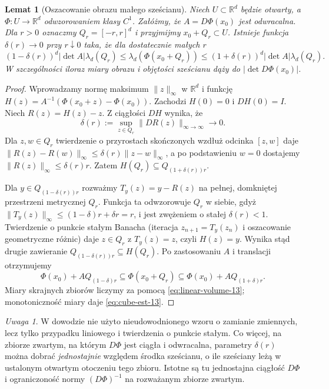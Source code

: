 \documentclass[11pt,a4paper,oneside]{book}
\numberwithin{equation}{chapter}
\theoremstyle{plain}
\newtheorem{lemat}[twierdzenie]{Lemat}
\theoremstyle{definition}
\theoremstyle{remark}
\newtheorem{uwaga}[twierdzenie]{Uwaga}
\begin{document}
\begin{lemat}[Oszacowanie obrazu małego sześcianu]
\label{lem:small-cube-13}
Niech $U\subset\mathbb R^d$ będzie otwarty, a
$\Phi:U\to\mathbb R^d$ odwzorowaniem klasy $C^1$.
Załóżmy, że $A=D\Phi(x_0)$ jest odwracalna.
Dla $r>0$ oznaczmy $Q_r=[-r,r]^d$ i przyjmijmy
$x_0+Q_r\subset U$. Istnieje funkcja $\delta(r)\to0$
przy $r\downarrow0$ taka, że dla dostatecznie małych $r$
\begin{equation}\label{eq:cube-est-13}
(1-\delta(r))^d|\det A|\lambda_d(Q_r)
\le \lambda_d(\Phi(x_0+Q_r))
\le(1+\delta(r))^d|\det A|\lambda_d(Q_r).
\end{equation}
W szczególności iloraz miary obrazu i objętości sześcianu
dąży do $|\det D\Phi(x_0)|$.
\end{lemat}
\begin{proof}
Wprowadzamy normę maksimum $\|z\|_\infty$ w $\mathbb R^d$
i funkcję $H(z)=A^{-1}(\Phi(x_0+z)-\Phi(x_0))$.
Zachodzi $H(0)=0$ i $DH(0)=I$.
Niech $R(z)=H(z)-z$. Z ciągłości $DH$ wynika, że
\[
\delta(r):=\sup_{z\in Q_r}\|DR(z)\|_{\infty\to\infty}
\longrightarrow0.
\]
Dla $z,w\in Q_r$ twierdzenie o przyrostach skończonych
wzdłuż odcinka $[z,w]$ daje
$\|R(z)-R(w)\|_\infty\le\delta(r)\|z-w\|_\infty$,
a po podstawieniu $w=0$ dostajemy
$\|R(z)\|_\infty\le\delta(r)r$.
Zatem $H(Q_r)\subseteq Q_{(1+\delta(r))r}$.

Dla $y\in Q_{(1-\delta(r))r}$ rozważmy
$T_y(z)=y-R(z)$ na pełnej, domkniętej przestrzeni
metrycznej $Q_r$. Funkcja ta odwzorowuje $Q_r$ w siebie,
gdyż $\|T_y(z)\|_\infty\le(1-\delta)r+\delta r=r$,
i jest zwężeniem o stałej $\delta(r)<1$.
Twierdzenie o punkcie stałym Banacha (iteracja
$z_{n+1}=T_y(z_n)$ i oszacowanie geometryczne różnic)
daje $z\in Q_r$ z $T_y(z)=z$, czyli $H(z)=y$.
Wynika stąd drugie zawieranie
$Q_{(1-\delta(r))r}\subseteq H(Q_r)$.
Po zastosowaniu $A$ i translacji otrzymujemy
\[
\Phi(x_0)+A Q_{(1-\delta)r}
\subseteq\Phi(x_0+Q_r)
\subseteq\Phi(x_0)+A Q_{(1+\delta)r}.
\]
Miary skrajnych zbiorów liczymy za pomocą
\eqref{eq:linear-volume-13}; monotoniczność miary
daje \eqref{eq:cube-est-13}.
\end{proof}

\begin{uwaga}
W dowodzie nie użyto nieudowodnionego wzoru o zamianie zmiennych,
lecz tylko przypadku liniowego i twierdzenia o punkcie stałym.
Co więcej, na zbiorze zwartym, na którym $D\Phi$ jest ciągła
i odwracalna, parametry $\delta(r)$ można dobrać
\emph{jednostajnie} względem środka sześcianu, o ile sześciany
leżą w ustalonym otwartym otoczeniu tego zbioru.
Istotne są tu jednostajna ciągłość $D\Phi$ i ograniczoność
normy $(D\Phi)^{-1}$ na rozważanym zbiorze zwartym.
\end{uwaga}
\end{document}
